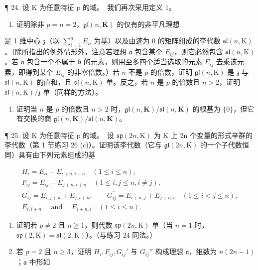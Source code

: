 ¶ 24. 设 K 为任意特征 p 的域。~我们再次采用定义 1。

\begin{enumerate}
\def\labelenumi{(\alph{enumi})}
\tightlist
\item
  证明除非 \(p = n = 2\)，\(\mathfrak{gl}(n, \mathbf{K})\) 的仅有的非平凡理想
\end{enumerate}

是 1 维中心 \(\mathfrak{z}\)（以 \(\sum_{i=1}^{n} E_{ii}\) 为基）以及由迹为 0 的矩阵组成的李代数 \(\mathfrak{sl}(n, \mathrm{K})\)。（除所指出的例外情形外，注意若理想 \(\mathfrak{a}\) 包含某个 \(E_{ij}\)，则它必然包含 \(\mathfrak{sl}(n, \mathrm{K})\)。若 \(\mathfrak{a}\) 包含一个不属于 \(\mathfrak{b}\) 的元素，则用至多四个适当选取的元素 \(E_{ij}\) 去乘该元素，即得到某个 \(E_{ij}\) 的非零倍数。）若 \(n\) 不是 \(p\) 的倍数，证明 \(\mathfrak{gl}(n, \mathrm{K})\) 是 \(\mathfrak{z}\) 与 \(\mathfrak{sl}(n, \mathrm{K})\) 的直和，且 \(\mathfrak{sl}(n, \mathrm{K})\) 单。反之，若 \(n\) 是 \(p\) 的倍数且 \(n > 2\)，证明 \(\mathfrak{sl}(n, \mathrm{K}) / \mathfrak{z}\) 单（同样的方法）。

\begin{enumerate}
\def\labelenumi{(\alph{enumi})}
\setcounter{enumi}{1}
\tightlist
\item
  证明当 \(n\) 是 \(p\) 的倍数且 \(n > 2\) 时，\(\mathfrak{gl}(n, \mathbf{K}) / \mathfrak{sl}(n, \mathbf{K})\) 的根基为 \(\{0\}\)，但它有交换的商 \(\mathfrak{gl}(n, \mathbf{K}) / \mathfrak{sl}(n, \mathbf{K})\)。
\end{enumerate}

¶ 25. 设 K 为任意特征 p 的域。~设 \(\mathfrak{sp}(2n, \mathrm{K})\) 为 K 上 2n 个变量的形式辛群的李代数（第 1 节练习 26 (c)）。证明该李代数（它与 \(\mathfrak{gl}(2n, \mathrm{K})\) 的一个子代数恒同）具有由下列元素组成的基

\[
\begin{array}{c} H _ {i} = E _ {i i} - E _ {i + n, i + n} \quad (1 \leqslant i \leqslant n), \\ F _ {i j} = E _ {i j} - E _ {j + n, i + n} \quad (1 \leqslant i, j \leqslant n, i \neq j), \\ G _ {i j} ^ {\prime} = E _ {i, j + n} + E _ {j, i + n}, \qquad G _ {i j} ^ {\prime \prime} = E _ {i + n, j} + E _ {j + n, i} \quad (1 \leqslant i <   j \leqslant n), \\ E _ {i, i + n} \quad \text { and } \quad E _ {i + n, i} \quad (1 \leqslant i \leqslant n). \end{array}
\]

\begin{enumerate}
\def\labelenumi{(\alph{enumi})}
\item
  证明若 \(p \neq 2\) 且 \(n \geqslant 1\)，则代数 \(\mathfrak{sp}(2n, \mathrm{K})\) 单（当 \(n = 1\) 时，\(\mathfrak{sp}(2, \mathrm{K}) = \mathfrak{sl}(2, \mathrm{K})\)）。（与练习 24 同法。）
\item
  若 \(p = 2\) 且 \(n \geqslant 3\)，证明 \(H_{i}, F_{ij}, G_{ij}'\) 与 \(G_{ij}''\) 构成理想 \(\mathfrak{a}\)，维数为 \(n(2n - 1)\)；\(\mathfrak{a}\) 中形如
\end{enumerate}

